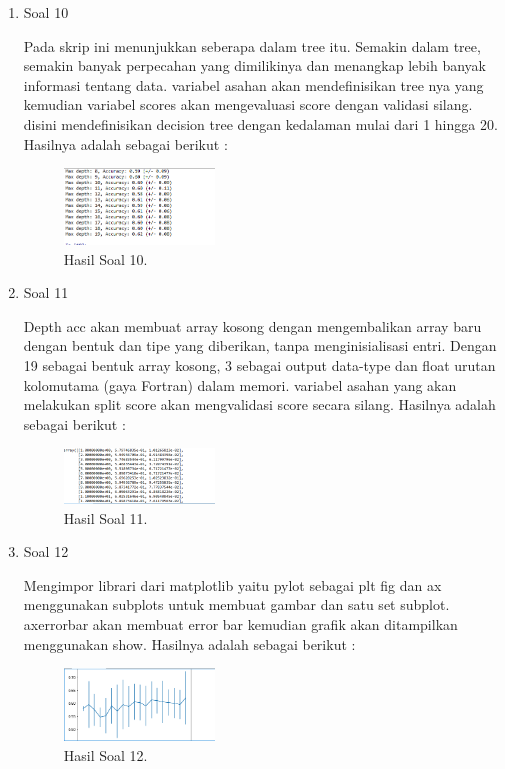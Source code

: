 \begin{enumerate}
	\item Soal 10
	\hfill\break
	
	Pada skrip ini menunjukkan seberapa dalam tree itu. Semakin dalam tree, semakin banyak perpecahan yang dimilikinya dan menangkap lebih banyak informasi tentang data. variabel asahan akan mendefinisikan tree nya yang kemudian variabel scores akan mengevaluasi score dengan validasi silang. disini mendefinisikan decision tree dengan kedalaman mulai dari 1 hingga 20. Hasilnya adalah sebagai berikut :
	\begin{figure}[H]
	\centering
		\includegraphics[width=4cm]{figures/1174095/tugas2/materi/hasil10.PNG}
		\caption{Hasil Soal 10.}
	\end{figure}

	\item Soal 11
	\hfill\break
	
	Depth acc akan membuat array kosong dengan mengembalikan array baru dengan bentuk dan tipe yang diberikan, tanpa menginisialisasi entri. Dengan 19 sebagai bentuk array kosong, 3 sebagai output data-type dan float urutan kolomutama (gaya Fortran) dalam memori. variabel asahan yang akan melakukan split score akan mengvalidasi score secara silang. Hasilnya adalah sebagai berikut :
	\begin{figure}[H]
	\centering
		\includegraphics[width=4cm]{figures/1174095/tugas2/materi/hasil11.PNG}
		\caption{Hasil Soal 11.}
	\end{figure}

	\item Soal 12
	\hfill\break
	
	Mengimpor librari dari matplotlib yaitu pylot sebagai plt fig dan ax menggunakan subplots untuk membuat gambar dan satu set subplot. axerrorbar akan membuat error bar kemudian grafik akan ditampilkan menggunakan show. Hasilnya adalah sebagai berikut :
	\begin{figure}[H]
	\centering
		\includegraphics[width=4cm]{figures/1174095/tugas2/materi/hasil12.PNG}
		\caption{Hasil Soal 12.}
	\end{figure}
\end{enumerate}

